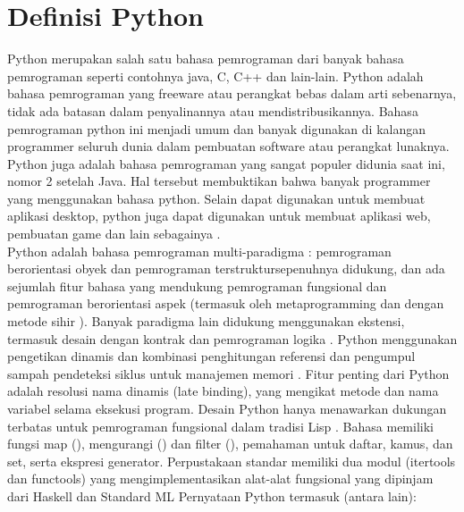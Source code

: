 \section{Definisi Python}
	Python merupakan salah satu bahasa pemrograman dari banyak bahasa pemrograman seperti contohnya java, C, C++ dan lain-lain. Python adalah bahasa pemrograman yang freeware atau perangkat bebas dalam arti sebenarnya, tidak ada batasan dalam penyalinannya atau mendistribusikannya. Bahasa pemrograman python ini menjadi umum dan banyak digunakan di kalangan programmer seluruh dunia dalam pembuatan software atau perangkat lunaknya. Python juga adalah bahasa pemrograman yang sangat populer didunia saat ini, nomor 2 setelah Java. Hal tersebut membuktikan bahwa banyak programmer yang menggunakan bahasa python. Selain dapat digunakan untuk membuat aplikasi desktop, python juga dapat digunakan untuk membuat aplikasi web, pembuatan game dan lain sebagainya \cite{malikhah2016eksplorasi}.\\

	Python adalah bahasa pemrograman multi-paradigma : pemrograman berorientasi obyek dan pemrograman terstruktursepenuhnya didukung, dan ada sejumlah fitur bahasa yang mendukung pemrograman fungsional dan pemrograman berorientasi aspek (termasuk oleh metaprogramming dan dengan metode sihir ).  Banyak paradigma lain didukung menggunakan ekstensi, termasuk desain dengan kontrak  dan pemrograman logika .
Python menggunakan pengetikan dinamis dan kombinasi penghitungan referensi dan pengumpul sampah pendeteksi siklus untuk manajemen memori . Fitur penting dari Python adalah resolusi nama dinamis (late binding), yang mengikat metode dan nama variabel selama eksekusi program.
Desain Python hanya menawarkan dukungan terbatas untuk pemrograman fungsional dalam tradisi Lisp . Bahasa memiliki fungsi map (), mengurangi () dan filter (), pemahaman untuk daftar, kamus, dan set, serta ekspresi generator. Perpustakaan standar memiliki dua modul (itertools dan functools) yang mengimplementasikan alat-alat fungsional yang dipinjam dari Haskell dan Standard ML 
Pernyataan Python termasuk (antara lain):\\

